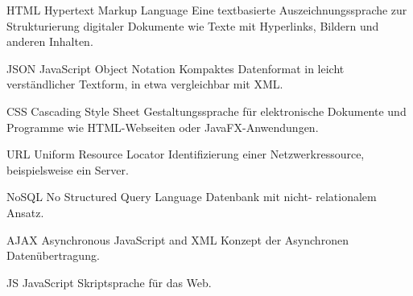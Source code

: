   {HTML}            %
  {Hypertext Markup Language}  %
  {Eine textbasierte Auszeichnungssprache zur Strukturierung digitaler Dokumente wie Texte mit Hyperlinks, Bildern und anderen Inhalten.} %
 
  
  {JSON}            %
  { JavaScript Object Notation}  %
  {Kompaktes Datenformat in leicht verständlicher Textform, in etwa vergleichbar mit XML.} %

  {CSS}            %
  { Cascading Style Sheet}  %
  {Gestaltungssprache für elektronische Dokumente und Programme wie HTML-Webseiten oder JavaFX-Anwendungen.} %


  {URL}            %
  { Uniform Resource Locator}  %
  {Identifizierung einer Netzwerkressource, beispielsweise ein Server.} %
    
  
  {NoSQL}            %
  { No Structured Query Language}  %
  {Datenbank mit nicht- relationalem Ansatz. } %
  
{AJAX}            %
{Asynchronous JavaScript and XML}  %
{Konzept der Asynchronen Datenübertragung. } %

{JS}            %
{JavaScript}  %
{Skriptsprache für das Web. } %






